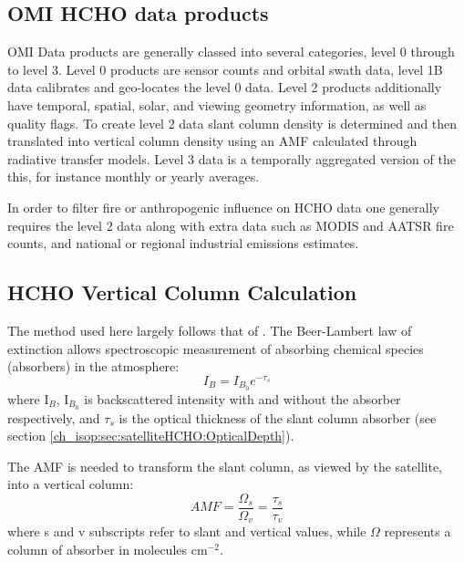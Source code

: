   \subsection{OMI HCHO data products}
    OMI Data products are generally classed into several categories, level 0 through to level 3. Level 0 products are sensor counts and orbital swath data, level 1B data calibrates and geo-locates the level 0 data. Level 2 products additionally have temporal, spatial, solar, and viewing geometry information, as well as quality flags. To create level 2 data slant column density is determined and then translated into vertical column density using an AMF calculated through radiative transfer models. Level 3 data is a temporally aggregated version of the this, for instance monthly or yearly averages.
    
    In order to filter fire or anthropogenic influence on HCHO data one generally requires the level 2 data along with extra data such as MODIS and AATSR fire counts, and national or regional industrial emissions estimates.
  
  \subsection{HCHO Vertical Column Calculation}
    \label{ch_isop:sec:satelliteHCHO:CalculationOfVC}
    
    The method used here largely follows that of \citet{Palmer2001}.
    The Beer-Lambert law of extinction allows spectroscopic measurement of absorbing chemical species (absorbers) in the atmosphere:
    \begin{equation} \label{ch_isop:eqn:beerlambert}
      I_B = I_{B_0} e^{-\tau_s}
    \end{equation}
    where I$_B$, I$_{B_0}$ is backscattered intensity with and without the absorber respectively, and $\tau_s$ is the optical thickness of the slant column absorber (see section \ref{ch_isop:sec:satelliteHCHO:OpticalDepth}).

    The AMF is needed to transform the slant column, as viewed by the satellite, into a vertical column:
    \begin{equation} \label{ch_isop:eqn:AMFratio}
      AMF = \frac{\Omega_s}{\Omega_v} = \frac{\tau_s}{\tau_v}
    \end{equation}
    where s and v subscripts refer to slant and vertical values, while $\Omega$ represents a column of absorber in molecules cm$^{-2}$.

